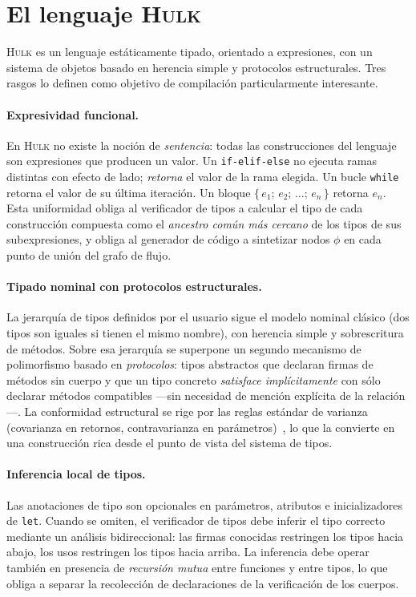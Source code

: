 \documentclass[11pt,a4paper,oneside,openany]{report}
\newcommand{\hulk}{\textsc{Hulk}}
\newcommand{\code}[1]{\texttt{#1}}
\begin{document}
\section{El lenguaje \hulk{}}

\hulk{} es un lenguaje estáticamente tipado, orientado a expresiones, con un
sistema de objetos basado en herencia simple y protocolos estructurales. Tres
rasgos lo definen como objetivo de compilación particularmente interesante.

\paragraph{Expresividad funcional.}
En \hulk{} no existe la noción de \textit{sentencia}: todas las construcciones
del lenguaje son expresiones que producen un valor. Un \code{if-elif-else} no
ejecuta ramas distintas con efecto de lado; \emph{retorna} el valor de la rama
elegida. Un bucle \code{while} retorna el valor de su última iteración. Un bloque
$\{\,e_1;\, e_2;\, \dots;\, e_n\,\}$ retorna $e_n$. Esta uniformidad obliga al
verificador de tipos a calcular el tipo de cada construcción compuesta como el
\emph{ancestro común más cercano} de los tipos de sus subexpresiones, y obliga al
generador de código a sintetizar nodos $\phi$ en cada punto de unión del grafo de
flujo.

\paragraph{Tipado nominal con protocolos estructurales.}
La jerarquía de tipos definidos por el usuario sigue el modelo nominal clásico
(dos tipos son iguales si tienen el mismo nombre), con herencia simple y
sobrescritura de métodos. Sobre esa jerarquía se superpone un segundo mecanismo
de polimorfismo basado en \textit{protocolos}: tipos abstractos que declaran
firmas de métodos sin cuerpo y que un tipo concreto \emph{satisface
implícitamente} con sólo declarar métodos compatibles ---sin necesidad de
mención explícita de la relación---. La conformidad estructural se rige por las
reglas estándar de varianza (covarianza en retornos, contravarianza en
parámetros)~\cite{pierce2002}, lo que la convierte en una construcción rica desde
el punto de vista del sistema de tipos.

\paragraph{Inferencia local de tipos.}
Las anotaciones de tipo son opcionales en parámetros, atributos e
inicializadores de \code{let}. Cuando se omiten, el verificador de tipos debe
inferir el tipo correcto mediante un análisis bidireccional: las firmas conocidas
restringen los tipos hacia abajo, los usos restringen los tipos hacia arriba.
La inferencia debe operar también en presencia de \emph{recursión mutua} entre
funciones y entre tipos, lo que obliga a separar la recolección de declaraciones
de la verificación de los cuerpos.
\end{document}
